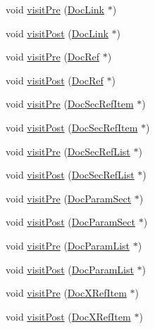 \begin{DoxyCompactItemize}
void \hyperlink{class_text_doc_visitor_a14456cc43b8cd5c37568c3711f74a6b4}{visit\+Pre} (\hyperlink{class_doc_link}{Doc\+Link} $\ast$)
\item 
void \hyperlink{class_text_doc_visitor_a3520c47737b0f1deda42755595963137}{visit\+Post} (\hyperlink{class_doc_link}{Doc\+Link} $\ast$)
\item 
void \hyperlink{class_text_doc_visitor_a2a0dab9a242b4531b13988f9b7c22b31}{visit\+Pre} (\hyperlink{class_doc_ref}{Doc\+Ref} $\ast$)
\item 
void \hyperlink{class_text_doc_visitor_a72997a77bda06f38b7ad2909d6d64708}{visit\+Post} (\hyperlink{class_doc_ref}{Doc\+Ref} $\ast$)
\item 
void \hyperlink{class_text_doc_visitor_aac69d129137b6f059cb96097558cb550}{visit\+Pre} (\hyperlink{class_doc_sec_ref_item}{Doc\+Sec\+Ref\+Item} $\ast$)
\item 
void \hyperlink{class_text_doc_visitor_ac07ab828fe4bf3537df9f23c97fc3dba}{visit\+Post} (\hyperlink{class_doc_sec_ref_item}{Doc\+Sec\+Ref\+Item} $\ast$)
\item 
void \hyperlink{class_text_doc_visitor_a74fc20f7aba2639b35b6dc2bd0c2c2e1}{visit\+Pre} (\hyperlink{class_doc_sec_ref_list}{Doc\+Sec\+Ref\+List} $\ast$)
\item 
void \hyperlink{class_text_doc_visitor_a891876a76415bf288aee0d423cc457c6}{visit\+Post} (\hyperlink{class_doc_sec_ref_list}{Doc\+Sec\+Ref\+List} $\ast$)
\item 
void \hyperlink{class_text_doc_visitor_aed72318df2230e88d1350ebb824076ea}{visit\+Pre} (\hyperlink{class_doc_param_sect}{Doc\+Param\+Sect} $\ast$)
\item 
void \hyperlink{class_text_doc_visitor_ab784b995570cda329c7f37a3a4405534}{visit\+Post} (\hyperlink{class_doc_param_sect}{Doc\+Param\+Sect} $\ast$)
\item 
void \hyperlink{class_text_doc_visitor_aeb7f39752565c6ed29d8357a689b8865}{visit\+Pre} (\hyperlink{class_doc_param_list}{Doc\+Param\+List} $\ast$)
\item 
void \hyperlink{class_text_doc_visitor_abf0401c396318603fdb1c08d4a2bbb42}{visit\+Post} (\hyperlink{class_doc_param_list}{Doc\+Param\+List} $\ast$)
\item 
void \hyperlink{class_text_doc_visitor_a7a45ecdd0ee0ad9ba701bbd879651496}{visit\+Pre} (\hyperlink{class_doc_x_ref_item}{Doc\+X\+Ref\+Item} $\ast$)
\item 
void \hyperlink{class_text_doc_visitor_a84b165ccbb9190df135c976bd25a36cf}{visit\+Post} (\hyperlink{class_doc_x_ref_item}{Doc\+X\+Ref\+Item} $\ast$)

\end{DoxyCompactItemize}
